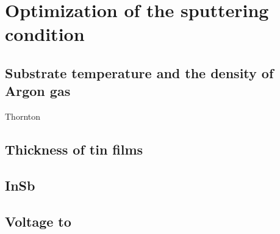 \documentclass[11pt,a4paper]{jsarticle}
\begin{document}

\section{Optimization of the sputtering condition}
\subsection{Substrate temperature and the density of Argon gas}

Thornton 
\subsection{Thickness of tin films}
\subsection{InSb}
\subsection{Voltage to }



\end{document}
